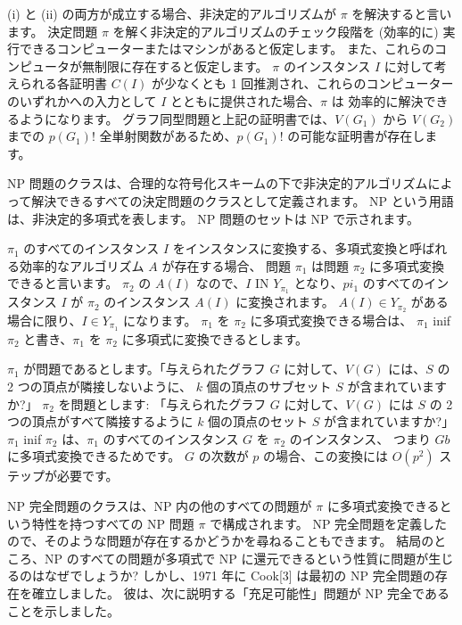 
(i) と (ii) の両方が成立する場合、非決定的アルゴリズムが $\pi$ を解決すると言います。 
決定問題 $\pi$ を解く非決定的アルゴリズムのチェック段階を (効率的に) 実行できるコンピューターまたはマシンがあると仮定します。
また、これらのコンピュータが無制限に存在すると仮定します。 $\pi$ のインスタンス $I$ に対して考えられる各証明書 $C(I)$ が少なくとも
1 回推測され、これらのコンピューターのいずれかへの入力として $I$ とともに提供された場合、$\pi$ は 効率的に解決できるようになります。
グラフ同型問題と上記の証明書では、$V(G_1)$ から $V(G_2)$ までの $p(G_1)!$ 全単射関数があるため、$p(G_1)!$ の可能な証明書が存在します。

NP 問題のクラスは、合理的な符号化スキームの下で非決定的アルゴリズムによって解決できるすべての決定問題のクラスとして定義されます。 
NP という用語は、非決定的多項式を表します。 NP 問題のセットは NP で示されます。

$\pi_1$ のすべてのインスタンス $I$ をインスタンスに変換する、多項式変換と呼ばれる効率的なアルゴリズム $A$ が存在する場合、
問題 $\pi_1$ は問題 $\pi_2$ に多項式変換できると言います。 $\pi_2$ の $A(I)$ なので、$I$ IN $Y_{\pi_1}$ となり、$pi_1$ のすべてのインスタンス $I$ が
$\pi_2$ のインスタンス $A(I)$ に変換されます。 $A(I) \in Y_{\pi_2}$ がある場合に限り、$I \in Y_{\pi_1}$ になります。 $\pi_1$ を $\pi_2$ に多項式変換できる場合は、
$\pi_1$ inif $\pi_2$ と書き、$\pi_1$ を $\pi_2$ に多項式に変換できるとします。

$\pi_1$ が問題であるとします。「与えられたグラフ $G$ に対して、$V(G)$ には、$S$ の 2 つの頂点が隣接しないように、
$k$ 個の頂点のサブセット $S$ が含まれていますか?」 $\pi_2$ を問題とします: 「与えられたグラフ $G$ に対して、$V(G)$ には $S$ の 
2 つの頂点がすべて隣接するように $k$ 個の頂点のセット $S$ が含まれていますか?」 $\pi_1$ inif $\pi_2$ は、$\pi_1$ のすべてのインスタンス $G$ を $\pi_2$ のインスタンス、
つまり $Gb$ に多項式変換できるためです。
$G$ の次数が $p$ の場合、この変換には $O(p^2)$ ステップが必要です。

NP 完全問題のクラスは、NP 内の他のすべての問題が $\pi$ に多項式変換できるという特性を持つすべての 
NP 問題 $\pi$ で構成されます。 NP 完全問題を定義したので、そのような問題が存在するかどうかを尋ねることもできます。 
結局のところ、NP のすべての問題が多項式で NP に還元できるという性質に問題が生じるのはなぜでしょうか? 
しかし、1971 年に Cook[3] は最初の NP 完全問題の存在を確立しました。 彼は、次に説明する「充足可能性」問題が NP 完全であることを示しました。

